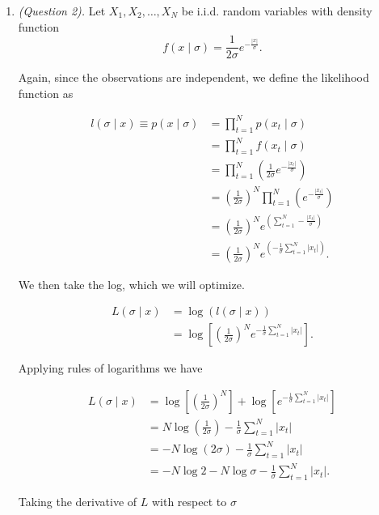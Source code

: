 \documentclass[12pt]{article}
\begin{document}
\begin{enumerate}
Therefore the maximum likelihood estimate of $\theta$ is $\hat{\theta} = \boxed{\frac{1}{2}}$. 

\item \emph{(Question 2).} Let $X_1, X_2, \ldots, X_N$ be i.i.d. random variables with density function
\[
f(x \mid \sigma) = \frac{1}{2\sigma}e^{-\frac{|x|}{\sigma}}.
\]

Again, since the observations are independent, we define the likelihood function as

\[
\begin{aligned}
l(\sigma \mid x) \equiv p(x \mid \sigma)
&= \prod_{t=1}^N p(x_t \mid \sigma) \\
&= \prod_{t=1}^N f(x_t \mid \sigma) \\
&= \prod_{t=1}^N \left(\frac{1}{2\sigma}e^{-\frac{|x_t|}{\sigma}}\right) \\
&= \left(\frac{1}{2\sigma}\right)^N
   \prod_{t=1}^N \left(e^{-\frac{|x_t|}{\sigma}}\right) \\
&= \left(\frac{1}{2\sigma}\right)^N
   e^{\left(\displaystyle \sum_{t=1}^N -\frac{|x_t|}{\sigma}\right)}\\
&= \left(\frac{1}{2\sigma}\right)^N
   e^{\left(\displaystyle -\frac{1}{\sigma} \sum_{t=1}^N |x_t|\right)}.
\end{aligned}
\] 

We then take the log, which we will optimize.

\[
\begin{aligned}
L(\sigma \mid x)
&= \log\left(l(\sigma \mid x)\right) \\
&= \log\left[\left(\frac{1}{2\sigma}\right)^N
   e^{-\frac{1}{\sigma}\sum_{t=1}^N |x_t|}\right].
\end{aligned}
\]

Applying rules of logarithms we have

\[
\begin{aligned}
L(\sigma \mid x)
&= \log\left[\left(\frac{1}{2\sigma}\right)^N\right]
   + \log\left[e^{-\frac{1}{\sigma}\sum_{t=1}^N |x_t|}\right] \\
&= N\log\left(\frac{1}{2\sigma}\right)
   - \frac{1}{\sigma}\sum_{t=1}^N |x_t| \\
&= -N\log(2\sigma) - \frac{1}{\sigma}\sum_{t=1}^N |x_t| \\
&= -N\log 2 - N\log\sigma - \frac{1}{\sigma}\sum_{t=1}^N |x_t|.
\end{aligned}
\]

Taking the derivative of $L$ with respect to $\sigma$


\end{enumerate}
\end{document}
